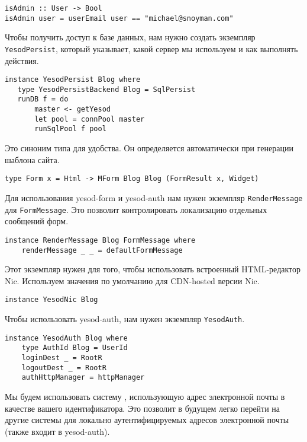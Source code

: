 \begin{lstlisting}
isAdmin :: User -> Bool
isAdmin user = userEmail user == "michael@snoyman.com"
\end{lstlisting}

Чтобы получить доступ к базе данных, нам нужно создать экземпляр \lstinline!YesodPersist!, который указывает, какой сервер мы используем и как выполнять действия.

\begin{lstlisting}
instance YesodPersist Blog where
   type YesodPersistBackend Blog = SqlPersist
   runDB f = do
       master <- getYesod
       let pool = connPool master
       runSqlPool f pool
\end{lstlisting}

Это синоним типа для удобства. Он определяется автоматически при генерации шаблона сайта.

\begin{lstlisting}
type Form x = Html -> MForm Blog Blog (FormResult x, Widget)
\end{lstlisting}

Для использования yesod-form и yesod-auth нам нужен экземпляр \lstinline!RenderMessage! для \lstinline!FormMessage!. Это позволит контролировать локализацию отдельных сообщений форм.

\begin{lstlisting}
instance RenderMessage Blog FormMessage where
    renderMessage _ _ = defaultFormMessage
\end{lstlisting}

Этот экземпляр нужен для того, чтобы использовать встроенный HTML-редактор Nic. Используем значения по умолчанию для CDN-hosted версии Nic.

\begin{lstlisting}
instance YesodNic Blog
\end{lstlisting}

Чтобы использовать yesod-auth, нам нужен экземпляр \lstinline!YesodAuth!.

\begin{lstlisting}
instance YesodAuth Blog where
    type AuthId Blog = UserId
    loginDest _ = RootR
    logoutDest _ = RootR
    authHttpManager = httpManager
\end{lstlisting}

Мы будем использовать систему , использующую адрес электронной почты в качестве вашего идентификатора. Это позволит в будущем легко перейти на другие системы для локально аутентифицируемых адресов электронной почты (также входит в yesod-auth).

